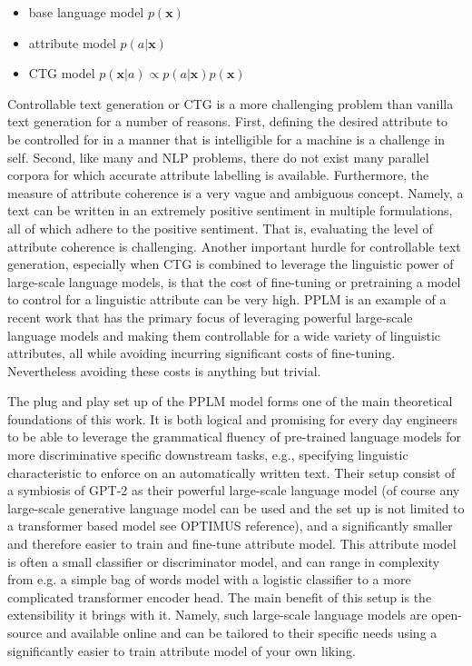 \begin{itemize}
    \item base language model $p(\textbf{x})$
    \item attribute model $p(a | \textbf{x})$
    \item CTG model $p(\textbf{x} | a ) \propto p(a | \textbf{x})p(\textbf{x})$
\end{itemize}

Controllable text generation or CTG is a more challenging problem than vanilla text generation for a number of reasons. First, defining the desired attribute to be controlled for in a manner that is intelligible for a machine is a challenge in self. Second, like many and NLP problems, there do not exist many parallel corpora for which accurate attribute labelling is available. Furthermore, the measure of attribute coherence is a very vague and ambiguous concept. Namely, a text can be written in an extremely positive sentiment in multiple formulations, all of which adhere to the positive sentiment. That is, evaluating the level of attribute coherence is challenging. Another important hurdle for controllable text generation, especially when CTG is combined to leverage the linguistic power of large-scale language models, is that the cost of fine-tuning or pretraining a model to control for a linguistic attribute can be very high. PPLM is an example of a recent work that has the primary focus of leveraging powerful large-scale language models and making them controllable for a wide variety of linguistic attributes, all while avoiding incurring significant costs of fine-tuning. Nevertheless avoiding these costs is anything but trivial.

The plug and play set up of the PPLM model forms one of the main theoretical foundations of this work. It is both logical and promising for every day engineers to be able to leverage the grammatical fluency of pre-trained language models for more discriminative specific downstream tasks, e.g., specifying linguistic characteristic to enforce on an automatically written text. Their setup consist of a symbiosis of GPT-2 as their powerful large-scale language model (of course any large-scale generative language model can be used and the set up is not limited to a transformer based model see OPTIMUS reference), and a significantly smaller and therefore easier to train and fine-tune attribute model. This attribute model is often a small classifier or discriminator model, and can range in complexity from e.g. a simple bag of words model with a logistic classifier to a more complicated transformer encoder head. The main benefit of this setup is the extensibility it brings with it. Namely, such large-scale language models are open-source and available online and can be tailored to their specific needs using a significantly easier to train attribute model of your own liking.

